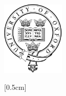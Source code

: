 \begin{titlepage}
\begin{center}
\vspace*{1.0cm}
\Huge
{\bf \xtitle}\\
\vspace*{2.5cm}
{\Large \bf
\xauthor\\
\xcollege\\
}
\vspace*{2.5cm}
\centerline{
\includegraphics[width=30mm]{ThesisFrontmatter/ps/crest}
}
\vspace*{1.5cm}
\normalsize

[0.5cm]
{\bf \xterm}\\

\vspace{2cm}

\end{center}
\end{titlepage}

